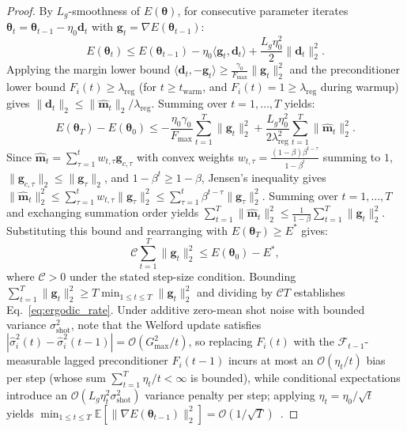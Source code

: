 \documentclass[11pt,a4paper]{article}
\begin{document}
\begin{proof}
By $L_g$-smoothness of $E(\boldsymbol{\theta})$, for consecutive parameter iterates $\boldsymbol{\theta}_t = \boldsymbol{\theta}_{t-1} - \eta_0 \mathbf{d}_t$ with $\mathbf{g}_t = \nabla E(\boldsymbol{\theta}_{t-1})$:
\begin{equation}
E(\boldsymbol{\theta}_t) \le E(\boldsymbol{\theta}_{t-1}) - \eta_0 \langle \mathbf{g}_t, \mathbf{d}_t \rangle + \frac{L_g \eta_0^2}{2} \|\mathbf{d}_t\|_2^2.
\end{equation}
Applying the margin lower bound $\langle \mathbf{d}_t, -\mathbf{g}_t \rangle \ge \frac{\gamma_0}{F_{\max}} \|\mathbf{g}_t\|_2^2$ and the preconditioner lower bound $F_i(t) \ge \lambda_{\text{reg}}$ (for $t \ge t_{\text{warm}}$, and $F_i(t) = 1 \ge \lambda_{\text{reg}}$ during warmup) gives $\|\mathbf{d}_t\|_2 \le \|\hat{\mathbf{m}}_t\|_2 / \lambda_{\text{reg}}$. Summing over $t = 1, \dots, T$ yields:
\begin{equation}
E(\boldsymbol{\theta}_T) - E(\boldsymbol{\theta}_0) \le -\frac{\eta_0 \gamma_0}{F_{\max}} \sum_{t=1}^T \|\mathbf{g}_t\|_2^2 + \frac{L_g \eta_0^2}{2 \lambda_{\text{reg}}^2} \sum_{t=1}^T \|\hat{\mathbf{m}}_t\|_2^2.
\end{equation}
Since $\hat{\mathbf{m}}_t = \sum_{\tau=1}^t w_{t,\tau} \mathbf{g}_{c,\tau}$ with convex weights $w_{t,\tau} = \frac{(1-\beta)\beta^{t-\tau}}{1-\beta^t}$ summing to $1$, $\|\mathbf{g}_{c,\tau}\|_2 \le \|\mathbf{g}_\tau\|_2$, and $1 - \beta^t \ge 1 - \beta$, Jensen's inequality gives $\|\hat{\mathbf{m}}_t\|_2^2 \le \sum_{\tau=1}^t w_{t,\tau} \|\mathbf{g}_\tau\|_2^2 \le \sum_{\tau=1}^t \beta^{t-\tau} \|\mathbf{g}_\tau\|_2^2$. Summing over $t=1,\dots,T$ and exchanging summation order yields $\sum_{t=1}^T \|\hat{\mathbf{m}}_t\|_2^2 \le \frac{1}{1-\beta} \sum_{t=1}^T \|\mathbf{g}_t\|_2^2$. Substituting this bound and rearranging with $E(\boldsymbol{\theta}_T) \ge E^*$ gives:
\begin{equation}
\mathcal{C} \sum_{t=1}^T \|\mathbf{g}_t\|_2^2 \le E(\boldsymbol{\theta}_0) - E^*,
\end{equation}
where $\mathcal{C} > 0$ under the stated step-size condition. Bounding $\sum_{t=1}^T \|\mathbf{g}_t\|_2^2 \ge T \min_{1 \le t \le T} \|\mathbf{g}_t\|_2^2$ and dividing by $\mathcal{C} T$ establishes Eq.~\eqref{eq:ergodic_rate}. Under additive zero-mean shot noise with bounded variance $\sigma_{\text{shot}}^2$, note that the Welford update satisfies $|\hat{\sigma}_i^2(t) - \hat{\sigma}_i^2(t-1)| = \mathcal{O}(G_{\max}^2 / t)$, so replacing $F_i(t)$ with the $\mathcal{F}_{t-1}$-measurable lagged preconditioner $F_i(t-1)$ incurs at most an $\mathcal{O}(\eta_t / t)$ bias per step (whose sum $\sum_{t=1}^T \eta_t / t < \infty$ is bounded), while conditional expectations introduce an $\mathcal{O}(L_g \eta_t^2 \sigma_{\text{shot}}^2)$ variance penalty per step; applying $\eta_t = \eta_0 / \sqrt{t}$ yields $\min_{1 \le t \le T} \mathbb{E}[\|\nabla E(\boldsymbol{\theta}_{t-1})\|_2^2] = \mathcal{O}(1/\sqrt{T})$~\cite{ghadimi2013stochastic}.
\end{proof}
\end{document}
